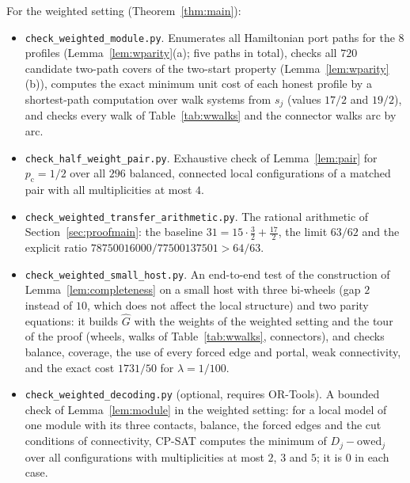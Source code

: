 \documentclass[11pt]{amsart}
\theoremstyle{definition}
\theoremstyle{remark}
\numberwithin{equation}{section}
\newcommand{\owed}{\mathrm{owed}}
\newcommand{\pc}{p_{\mathrm{c}}}
\newcommand{\Gh}{\widehat{G}}
\begin{document}
For the weighted setting (Theorem~\ref{thm:main}):
\begin{itemize}[leftmargin=2em]
\item \texttt{check\_weighted\_module.py}. Enumerates all Hamiltonian port paths for the $8$ profiles (Lemma~\ref{lem:wparity}(a); five paths in total), checks all $720$ candidate two-path covers of the two-start property (Lemma~\ref{lem:wparity}(b)), computes the exact minimum unit cost of each honest profile by a shortest-path computation over walk systems from $s_j$ (values $17/2$ and $19/2$), and checks every walk of Table~\ref{tab:wwalks} and the connector walks arc by arc.
\item \texttt{check\_half\_weight\_pair.py}. Exhaustive check of Lemma~\ref{lem:pair} for $\pc=1/2$ over all $296$ balanced, connected local configurations of a matched pair with all multiplicities at most $4$.
\item \texttt{check\_weighted\_transfer\_arithmetic.py}. The rational arithmetic of Section~\ref{sec:proofmain}: the baseline $31=15\cdot\frac32+\frac{17}{2}$, the limit $63/62$ and the explicit ratio $78750016000/77500137501>64/63$.
\item \texttt{check\_weighted\_small\_host.py}. An end-to-end test of the construction of Lemma~\ref{lem:completeness} on a small host with three bi-wheels (gap $2$ instead of $10$, which does not affect the local structure) and two parity equations: it builds $\Gh$ with the weights of the weighted setting and the tour of the proof (wheels, walks of Table~\ref{tab:wwalks}, connectors), and checks balance, coverage, the use of every forced edge and portal, weak connectivity, and the exact cost $1731/50$ for $\lambda=1/100$.
\item \texttt{check\_weighted\_decoding.py} (optional, requires OR-Tools). A bounded check of Lemma~\ref{lem:module} in the weighted setting: for a local model of one module with its three contacts, balance, the forced edges and the cut conditions of connectivity, CP-SAT computes the minimum of $D_j-\owed_j$ over all configurations with multiplicities at most $2$, $3$ and $5$; it is $0$ in each case.
\end{itemize}
\end{document}
